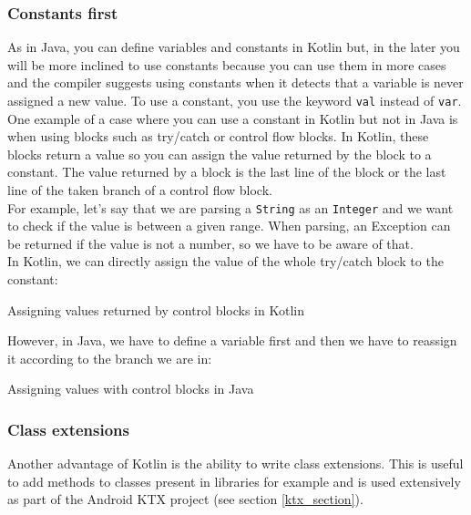 \documentclass[twoside, openright,11pt,a4paper]{book}
\newenvironment{code}{\captionsetup{type=listing}}{}
\begin{document}
\subsubsection{Constants first}
As in Java, you can define variables and constants in Kotlin but, in the later you will be more inclined to use constants because you can use them in more cases and the compiler suggests using constants when it detects that a variable is never assigned a new value. To use a constant, you use the keyword \verb+val+ instead of \verb+var+. \\

One example of a case where you can use a constant in Kotlin but not in Java is when using blocks such as try/catch or control flow blocks. In Kotlin, these blocks return a value so you can assign the value returned by the block to a constant. The value returned by a block is the last line of the block or the last line of the taken branch of a control flow block\cite{kotlin:doc:controlflow}. \\

For example, let's say that we are parsing a \verb+String+ as an \verb+Integer+ and we want to check if the value is between a given range. When parsing, an Exception can be returned if the value is not a number, so we have to be aware of that.\\

In Kotlin, we can directly assign the value of the whole try/catch block to the constant:
\begin{code}
\caption{Assigning values returned by control blocks in Kotlin}	
\end{code}

However, in Java, we have to define a variable first and then we have to reassign it according to the branch we are in:
\begin{code}
\caption{Assigning values with control blocks in Java}	
\end{code}
\subsubsection{Class extensions}
Another advantage of Kotlin is the ability to write class extensions\cite{kotlin:doc:extensions}. This is useful to add methods to classes present in libraries for example and is used extensively as part of the Android KTX project (see section \ref{ktx_section}).\\
\end{document}
